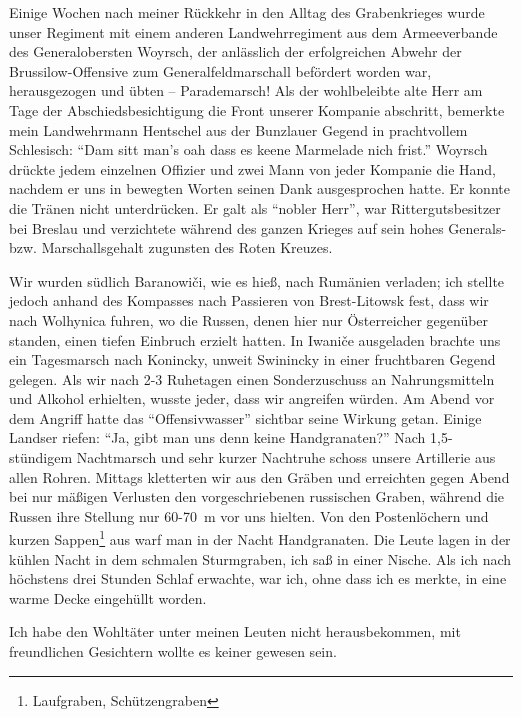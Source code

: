 Einige Wochen nach meiner Rückkehr in den Alltag des Grabenkrieges wurde unser Regiment mit einem anderen Landwehrregiment aus dem Armeeverbande des Generalobersten Woyrsch, der anlässlich der erfolgreichen Abwehr der Brussilow-Offensive zum Generalfeldmarschall befördert worden war, herausgezogen und übten -- Parademarsch! Als der wohlbeleibte alte Herr am Tage der Abschiedsbesichtigung die Front unserer Kompanie abschritt, bemerkte mein Landwehrmann Hentschel aus der Bunzlauer Gegend in prachtvollem Schlesisch: \enquote{Dam sitt man's oah dass es keene Marmelade nich frist.} Woyrsch drückte jedem einzelnen Offizier und zwei Mann von jeder Kompanie die Hand, nachdem er uns in bewegten Worten seinen Dank ausgesprochen hatte. Er konnte die Tränen nicht unterdrücken. Er galt als \enquote{nobler Herr}, war Rittergutsbesitzer bei Breslau und verzichtete während des ganzen Krieges auf sein hohes Generals- bzw. Marschallsgehalt zugunsten des Roten Kreuzes.

Wir wurden südlich Baranowiči, wie es hieß, nach Rumänien verladen; ich stellte jedoch anhand des Kompasses nach Passieren von Brest-Litowsk fest, dass wir nach Wolhynica fuhren, wo die Russen, denen hier nur Österreicher gegenüber standen, einen tiefen Einbruch erzielt hatten. In Iwaniče ausgeladen brachte uns ein Tagesmarsch nach Konincky, unweit Swinincky in einer fruchtbaren Gegend gelegen. Als wir nach 2-3 Ruhetagen einen Sonderzuschuss an Nahrungsmitteln und Alkohol erhielten, wusste jeder, dass wir angreifen würden. Am Abend vor dem Angriff hatte das \enquote{Offensivwasser} sichtbar seine Wirkung getan. Einige Landser riefen: \enquote{Ja, gibt man uns denn keine Handgranaten?} Nach 1,5-stündigem Nachtmarsch und sehr kurzer Nachtruhe schoss unsere Artillerie aus allen Rohren. Mittags kletterten wir aus den Gräben und erreichten gegen Abend bei nur mäßigen Verlusten den vorgeschriebenen russischen Graben, während die Russen ihre Stellung nur 60-70~m vor uns hielten. Von den Postenlöchern und kurzen Sappen\footnote{Laufgraben, Schützengraben} aus warf man in der Nacht Handgranaten. Die Leute lagen in der kühlen Nacht in dem schmalen Sturmgraben, ich saß in einer Nische. Als ich nach höchstens drei Stunden Schlaf erwachte, war ich, ohne dass ich es merkte, in eine warme Decke eingehüllt worden.

Ich habe den Wohltäter unter meinen Leuten nicht herausbekommen, mit freundlichen Gesichtern wollte es keiner gewesen sein.

